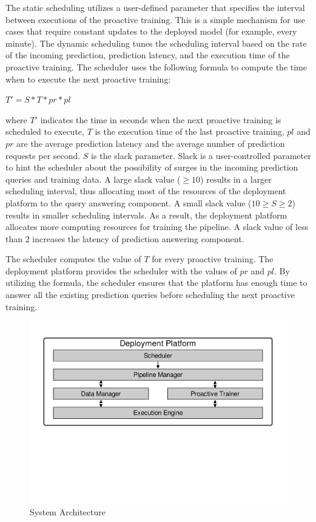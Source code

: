 The static scheduling utilizes a user-defined parameter that specifies the interval between executions of the proactive training.
This is a simple mechanism for use cases that require constant updates to the deployed model (for example, every minute).
The dynamic scheduling tunes the scheduling interval based on the rate of the incoming prediction, prediction latency, and the execution time of the proactive training.
The scheduler uses the following formula to compute the time when to execute the next proactive training:
\begin{center}
$T' = S * T * pr * pl$
\end{center}
where $T'$ indicates the time in seconds when the next proactive training is scheduled to execute, $T$ is the execution time of the last proactive training, $pl$ and $pr$ are the average prediction latency and the average number of prediction requests per second.
$S$ is the slack parameter.
Slack is a user-controlled parameter to hint the scheduler about the possibility of surges in the incoming prediction queries and training data.
A large slack value ($\geq10$) results in a larger scheduling interval, thus allocating most of the resources of the deployment platform to the query answering component.
A small slack value ($10 \geq S \geq 2$) results in smaller scheduling intervals.
As a result, the deployment platform allocates more computing resources for training the pipeline.
A slack value of less than 2 increases the latency of prediction answering component.

The scheduler computes the value of $T$ for every proactive training.
The deployment platform provides the scheduler with the values of $pr$ and $pl$. 
By utilizing the formula, the scheduler ensures that the platform has enough time to answer all the existing prediction queries before scheduling the next proactive training.
\begin{figure}[h]
\centering
\includegraphics[width=\columnwidth]{../images/system-architecture.pdf}
\caption{System Architecture}
\label{fig:system-architecture}
\end{figure}


